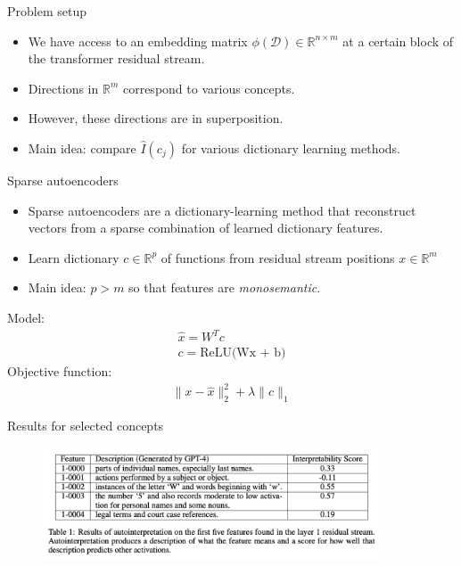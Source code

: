 \begin{frame}{Problem setup}
\begin{itemize}
    \item We have access to an embedding matrix $\phi(\mathcal D) \in \mathbb R^{n \times m}$ at a certain block of the transformer residual stream.
    \item Directions in $\mathbb R^m$ correspond to various concepts.
    \item However, these directions are in superposition.
    \item Main idea: compare $\hat I (c_j)$ for various dictionary learning methods.
\end{itemize}
\end{frame}

\begin{frame}{Sparse autoencoders}
\begin{itemize}
    \item Sparse autoencoders are a dictionary-learning method that reconstruct vectors from a sparse combination of learned dictionary features.
    \item Learn dictionary $c \in \mathbb R^p$ of functions from residual stream positions $x \in \mathbb R^m$
    \item Main idea: $p > m$ so that features are {\it monosemantic}.
\end{itemize}
Model:
    \begin{align*}
        \hat x = W^T c \\
        c = \text{ReLU(Wx + b)}
    \end{align*}
    Objective function:
    \begin{align*}
        \|x - \hat x\|_2^2 + \lambda \|c\|_1
    \end{align*}
\end{frame}

\begin{frame}{Results for selected concepts}
\begin{figure}
    \includegraphics[width=10cm]{img/table1.png}
    \caption*{\citet{Cunningham2023-mu}}
\end{figure}
\end{frame}

